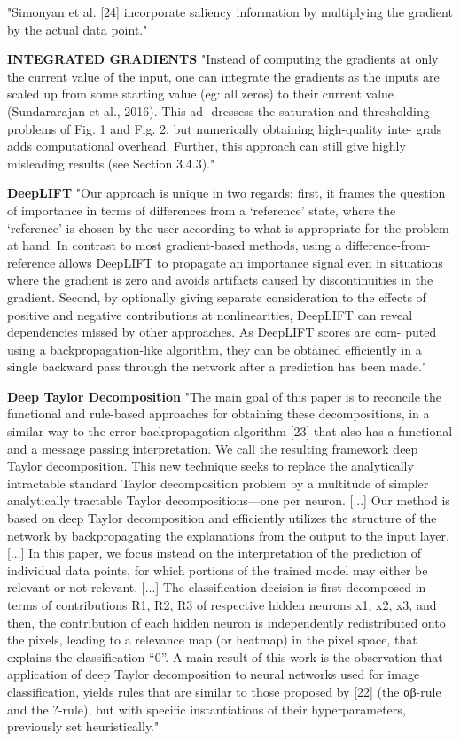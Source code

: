 		"Simonyan et al. [24] incorporate saliency information by multiplying the gradient by the actual data point." \cite{Montavon2017}
		
		\textbf{INTEGRATED GRADIENTS}
		"Instead of computing the gradients at only the current value of the input, one can integrate the gradients as the inputs are scaled up from some starting value (eg: all zeros) to their current value (Sundararajan et al., 2016). This ad- dressess the saturation and thresholding problems of Fig. 1 and Fig. 2, but numerically obtaining high-quality inte- grals adds computational overhead. Further, this approach can still give highly misleading results (see Section 3.4.3)." \cite{Shrikumar2017}
		
		\textbf{DeepLIFT}
		"Our approach is unique in two regards: first, it frames the question of importance in terms of differences from a ‘reference’ state, where the ‘reference’ is chosen by the user according to what is appropriate for the problem at hand. In contrast to most gradient-based methods, using a difference-from-reference allows DeepLIFT to propagate an importance signal even in situations where the gradient is zero and avoids artifacts caused by discontinuities in the gradient. Second, by optionally giving separate consideration to the effects of positive and negative contributions at nonlinearities, DeepLIFT can reveal dependencies missed by other approaches. As DeepLIFT scores are com- puted using a backpropagation-like algorithm, they can be obtained efficiently in a single backward pass through the network after a prediction has been made." \cite{Shrikumar2017}
		
		\textbf{Deep Taylor Decomposition}
		"The main goal of this paper is to reconcile the functional and rule-based approaches for obtaining these decompositions, in a similar way to the error backpropagation algorithm [23] that also has a functional and a message passing interpretation. We call the resulting framework deep Taylor decomposition. This new technique seeks to replace the analytically intractable standard Taylor decomposition problem by a multitude of simpler analytically tractable Taylor decompositions—one per neuron.
		[...]
		Our method is based on deep Taylor decomposition and efficiently utilizes the structure of the network by backpropagating the explanations from the output to the input layer.
		[...]
		In this paper, we focus instead on the interpretation of the prediction of individual data points, for which portions of the trained model may either be relevant or not relevant.
		[...]
		The classification decision is first decomposed in terms of contributions R1, R2, R3 of respective hidden neurons x1, x2, x3, and then, the contribution of each hidden neuron is independently redistributed onto the pixels, leading to a relevance map (or heatmap) in the pixel space, that explains the classification “0”.
		A main result of this work is the observation that application
		of deep Taylor decomposition to neural networks used for image classification, yields rules that are similar to those proposed by [22] (the αβ-rule and the ?-rule), but with specific instantiations of their hyperparameters, previously set heuristically." \cite{Montavon2017}


